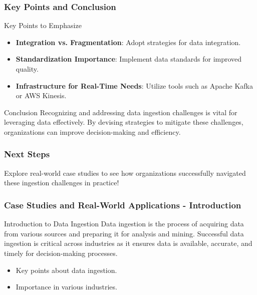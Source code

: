 \documentclass{beamer}
\begin{document}
\begin{frame}[fragile]
    \frametitle{Key Points and Conclusion}
    \begin{block}{Key Points to Emphasize}
        \begin{itemize}
            \item \textbf{Integration vs. Fragmentation}: Adopt strategies for data integration.
            \item \textbf{Standardization Importance}: Implement data standards for improved quality.
            \item \textbf{Infrastructure for Real-Time Needs}: Utilize tools such as Apache Kafka or AWS Kinesis.
        \end{itemize}
    \end{block}
    
    \begin{block}{Conclusion}
        Recognizing and addressing data ingestion challenges is vital for leveraging data effectively.
        \newline
        By devising strategies to mitigate these challenges, organizations can improve decision-making and efficiency.
    \end{block}
\end{frame}

\begin{frame}[fragile]
    \frametitle{Next Steps}
    Explore real-world case studies to see how organizations successfully navigated these ingestion challenges in practice!
\end{frame}

\begin{frame}[fragile]
    \frametitle{Case Studies and Real-World Applications - Introduction}
    \begin{block}{Introduction to Data Ingestion}
        Data ingestion is the process of acquiring data from various sources and preparing it for analysis and mining. Successful data ingestion is critical across industries as it ensures data is available, accurate, and timely for decision-making processes.
    \end{block}
    \begin{itemize}
        \item Key points about data ingestion.
        \item Importance in various industries.
    \end{itemize}
\end{frame}
\end{document}
